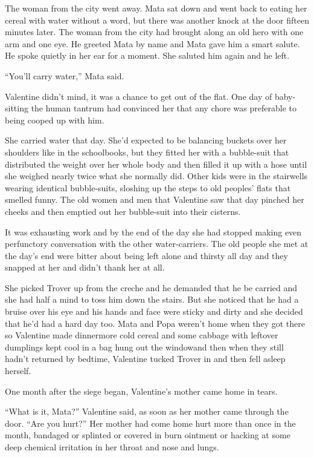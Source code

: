 The woman from the city went away. Mata sat down and went back to
eating her cereal with water without a word, but there was another
knock at the door fifteen minutes later. The woman from the city
had brought along an old hero with one arm and one eye. He greeted
Mata by name and Mata gave him a smart salute. He spoke quietly in
her ear for a moment. She saluted him again and he left.

“You’ll carry water,” Mata said.

Valentine didn’t mind, it was a chance to get out of the flat. One
day of baby-sitting the human tantrum had convinced her that any
chore was preferable to being cooped up with him.

She carried water that day. She’d expected to be balancing buckets
over her shoulders like in the schoolbooks, but they fitted her
with a bubble-suit that distributed the weight over her whole body
and then filled it up with a hose until she weighed nearly twice
what she normally did. Other kids were in the stairwells wearing
identical bubble-suits, sloshing up the steps to old peoples’ flats
that smelled funny. The old women and men that Valentine saw that
day pinched her cheeks and then emptied out her bubble-suit into
their cisterns.

It was exhausting work and by the end of the day she had stopped
making even perfunctory conversation with the other water-carriers.
The old people she met at the day’s end were bitter about being
left alone and thirsty all day and they snapped at her and didn’t
thank her at all.

She picked Trover up from the creche and he demanded that he be
carried and she had half a mind to toss him down the stairs. But
she noticed that he had a bruise over his eye and his hands and
face were sticky and dirty and she decided that he’d had a hard day
too. Mata and Popa weren’t home when they got there so Valentine
made dinner\dash{}more cold cereal and some cabbage with leftover
dumplings kept cool in a bag hung out the window\dash{}and then when they
still hadn’t returned by bedtime, Valentine tucked Trover in and
then fell asleep herself.

\tb

One month after the siege began, Valentine’s mother came home in
tears.

“What is it, Mata?” Valentine said, as soon as her mother came
through the door. “Are you hurt?” Her mother had come home hurt
more than once in the month, bandaged or splinted or covered in
burn ointment or hacking at some deep chemical irritation in her
throat and nose and lungs.

